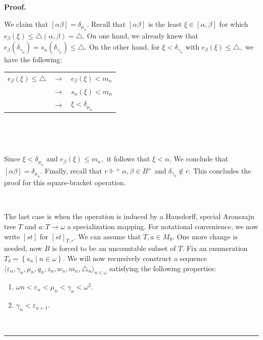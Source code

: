 \documentclass{article}
\newenvironment{proof}[1][Proof]{\noindent\textbf{#1.} }{\ \rule{0.5em}{0.5em}}
\begin{document}
\begin{proof}
\qquad\qquad\qquad\qquad\qquad\ \ \ 

We claim that $\left[  \alpha\beta\right]  =\delta_{\mu_{n}}.$ Recall that
$\left[  \alpha\beta\right]  $ is the least $\xi\in\left[  \alpha
,\beta\right]  $ for which $e_{\beta}\left(  \xi\right)  \leq\triangle\left(
\alpha,\beta\right)  =\triangle.$ On one hand, we already knew that $e_{\beta
}(\delta_{\gamma_{n}})=s_{n}\left(  \delta_{\gamma_{n}}\right)  \leq\triangle
$. On the other hand, for $\xi<\delta_{\gamma_{n}}$ with $e_{\beta}\left(
\xi\right)  \leq\triangle,$ we have the following:\medskip

\hfill%
\begin{tabular}
[c]{lll}%
$e_{\beta}\left(  \xi\right)  \leq\triangle$ & $\longrightarrow$ & $e_{\beta
}\left(  \xi\right)  <m_{n}$\\
& $\longrightarrow$ & $s_{n}\left(  \xi\right)  <m_{n}$\\
& $\longrightarrow$ & $\xi<\delta_{\mu_{n}}$%
\end{tabular}
\hfill\ 

\qquad\ \qquad\ \ 

Since $\xi<\delta_{\mu_{n}}$ and $e_{\beta}\left(  \xi\right)  \leq m_{n},$ it
follows that $\xi<\alpha.$ We conclude that $\left[  \alpha\beta\right]
=\delta_{\mu_{n}}.$ Finally, recall that $r\Vdash$\textquotedblleft%
$\alpha,\beta\in\dot{B}$\textquotedblright\ and $\delta_{\gamma_{n}}\notin r.$
This concludes the proof for this square-bracket operation.

\qquad\ \qquad\ \qquad\ \ \ \ \qquad\ 

The last case is when the operation is induced by a Hausdorff, special
Aronszajn tree $T$ and $a:T\longrightarrow\omega$ a specialization mapping.
For notational convenience, we now write $\left[  st\right]  $ for $\left[
st\right]  _{T,r}$. We can assume that $T,a\in M_{0}.$ One more change is
needed, now $\dot{B}$ is forced to be an uncountable subset of $T.$ Fix an
enumeration $T_{\delta}=\left\{  s_{n}\mid n\in\omega\right\}  $. We will now
recursively construct a sequence $\langle\varepsilon_{n},\gamma_{n},\mu
_{n},q_{n},z_{n},w_{n},m_{n},\triangle_{n}\rangle_{n\in\omega}$ satisfying the
following properties:

\begin{enumerate}
\item $\omega n<\varepsilon_{n}<\mu_{n}<\gamma_{n}<\omega^{2}.$

\item $\gamma_{n}<\varepsilon_{n+1}.$


\end{enumerate}
\end{proof}
\end{document}
